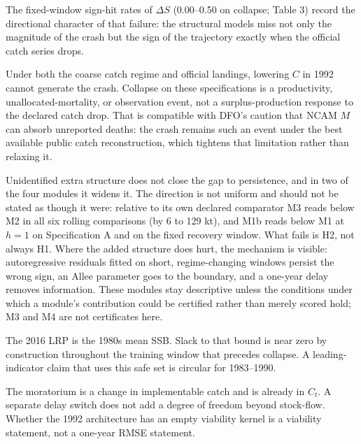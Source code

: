 \documentclass[11pt]{article}
\begin{document}
The fixed-window sign-hit rates of \(\Delta S\) (0.00--0.50 on collapse;
Table 3) record the directional character of that failure: the
structural models miss not only the magnitude of the crash but the sign
of the trajectory exactly when the official catch series drops.

Under both the coarse catch regime and official landings, lowering \(C\)
in 1992 cannot generate the crash. Collapse on these specifications is a
productivity, unallocated-mortality, or observation event, not a
surplus-production response to the declared catch drop. That is
compatible with DFO's caution that NCAM \(M\) can absorb unreported
deaths: the crash remains such an event under the best available public
catch reconstruction, which tightens that limitation rather than
relaxing it.

Unidentified extra structure does not close the gap to persistence, and
in two of the four modules it widens it. The direction is not uniform
and should not be stated as though it were: relative to its own declared
comparator M3 reads below M2 in all six rolling comparisons (by 6 to 129
kt), and M1b reads below M1 at \(h=1\) on Specification A and on the
fixed recovery window. What fails is H2, not always H1. Where the added
structure does hurt, the mechanism is visible: autoregressive residuals
fitted on short, regime-changing windows persist the wrong sign, an
Allee parameter goes to the boundary, and a one-year delay removes
information. These modules stay descriptive unless the conditions under
which a module's contribution could be certified rather than merely
scored hold; M3 and M4 are not certificates here.

The 2016 LRP is the 1980s mean SSB. Slack to that bound is near zero by
construction throughout the training window that precedes collapse. A
leading-indicator claim that uses this safe set is circular for
1983--1990.

The moratorium is a change in implementable catch and is already in
\(C_t\). A separate delay switch does not add a degree of freedom beyond
stock-flow. Whether the 1992 architecture has an empty viability kernel
is a viability statement, not a one-year RMSE statement.
\end{document}
